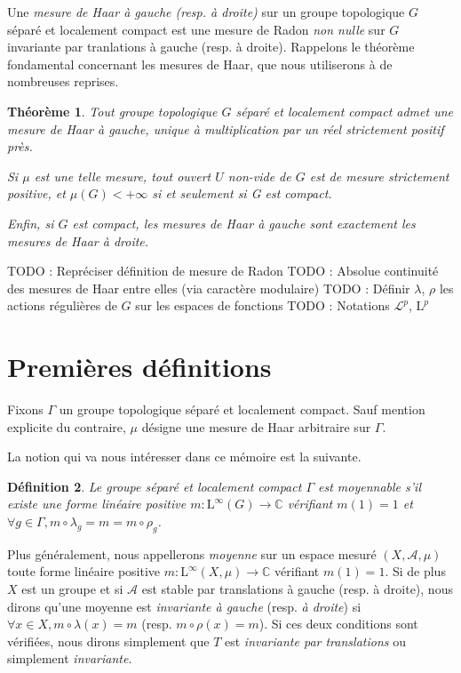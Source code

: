 \documentclass[a4paper,12pt]{article}
\newtheorem{theorem}{Théorème}[section]
\newtheorem{definition}[theorem]{Définition}
\newcommand{\C}{\mathbb{C}}
\newcommand{\ssi}{si et seulement si }
\newcommand{\comp}{\circ}
\newcommand{\TODO}[1]{{\color{red}TODO :} #1}
\begin{document}
Une \textit{mesure de Haar à gauche (resp. à droite)} sur un groupe topologique $G$ séparé et localement compact est une mesure de
Radon \emph{non nulle} sur $G$ invariante par tranlations à gauche (resp. à droite). Rappelons le théorème fondamental concernant les mesures de Haar, que nous 
utiliserons à de nombreuses reprises.

\begin{theorem}\label{theorem_Haar}
    Tout groupe topologique $G$ séparé et localement compact admet une mesure de Haar à gauche, unique à multiplication par un réel strictement 
    positif près. 
    
    Si $\mu$ est une telle mesure, tout ouvert $U$ non-vide de $G$ est de mesure strictement positive,
    et $\mu(G)<+\infty$ \ssi G est compact.

    Enfin, si $G$ est compact, les mesures de Haar à gauche sont exactement les mesures de Haar à droite.
\end{theorem}

\TODO{Repréciser définition de mesure de Radon}
\TODO{Absolue continuité des mesures de Haar entre elles (via caractère modulaire)}
\TODO{Définir $\lambda$, $\rho$ les actions régulières de $G$ sur les espaces de fonctions}
\TODO{Notations $\mathscr{L}^p$, $\mathrm{L}^p$}

\section{Premières définitions}

Fixons $\Gamma$ un groupe topologique séparé et localement compact. Sauf mention explicite du contraire, $\mu$ désigne une mesure de Haar arbitraire
sur $\Gamma$.

La notion qui va nous intéresser dans ce mémoire est la suivante.

\begin{definition}\label{amenable_def}
    Le groupe séparé et localement compact $\Gamma$ est \emph{moyennable} s'il existe une forme linéaire positive $m : \mathrm{L}^\infty(G)\to\C$
    vérifiant $m(1) = 1$ et $\forall g\in\Gamma, m\comp\lambda_g = m = m\comp\rho_g$.
\end{definition}

Plus généralement, nous appellerons \emph{moyenne} sur un espace mesuré $(X,\mathcal{A},\mu)$ toute forme 
linéaire positive $m : \mathrm{L}^\infty(X, \mu)\to\C$ vérifiant $m(1) = 1$. Si de plus $X$ est un groupe 
et si $\mathcal{A}$ est stable par translations à gauche (resp. à droite), nous dirons qu'une moyenne est \emph{invariante à gauche}
(resp. \emph{à droite}) si $\forall x\in X, m\comp\lambda(x) = m$ (resp. $m\comp\rho(x) = m$). Si ces deux conditions 
sont vérifiées, nous dirons simplement que $T$ est \emph{invariante par translations} ou simplement \emph{invariante}.
\end{document}
